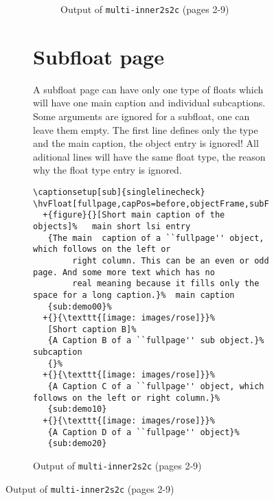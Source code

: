 \documentclass[twoside,paper=a4,usegeometry]{scrartcl}
\begin{document}
\begin{figure}[p]
\begin{figure}[p]
\begin{figure}[!h]
\hfill
{}\hfill
{}\hfill
{}%

\hfill
{}\hfill
{}\hfill
{}
\caption{Output of \texttt{multi-inner2s2c} (pages 2-9)}\label{multi-inners2s2c}
\end{figure}



\section{Subfloat page}
A subfloat page can have only one type of floats which will have one main caption and
individual subcaptions.
Some arguments are ignored for a subfloat, one can leave them empty. The first line defines only the type and the main caption,
the object entry is ignored! All aditional lines will have the same float type, the reason why the
float type entry is ignored.

\enlargethispage{\normalbaselineskip}

\begin{lstlisting}
\captionsetup[sub]{singlelinecheck}
\hvFloat[fullpage,capPos=before,objectFrame,subFloat,vFill]%
  +{figure}{}[Short main caption of the objects]%   main short lsi entry
   {The main  caption of a ``fullpage'' object, which follows on the left or
        right column. This can be an even or odd page. And some more text which has no
        real meaning because it fills only the space for a long caption.}%  main caption
   {sub:demo00}%
  +{}{\texttt{[image: images/rose]}}%
   [Short caption B]%
   {A Caption B of a ``fullpage'' sub object.}%  subcaption
   {}%
  +{}{\texttt{[image: images/rose]}}%
   {A Caption C of a ``fullpage'' object, which follows on the left or right column.}%
   {sub:demo10}
  +{}{\texttt{[image: images/rose]}}%
   {A Caption D of a ``fullpage'' object}%
   {sub:demo20}
\end{lstlisting}



\end{figure}
\end{figure}
\end{document}
